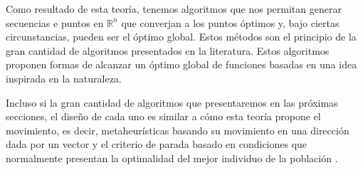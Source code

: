Como resultado de esta teoría, tenemos algoritmos que nos permitan generar secuencias e puntos en $\mathbb{R}^n$ que converjan a los puntos óptimos y, bajo ciertas circunstancias, pueden ser el óptimo global. 
Estos métodos son el principio de la gran cantidad de algoritmos presentados en la literatura. 
Estos algoritmos proponen formas de alcanzar un óptimo global  de funciones basadas en una idea inspirada en la naturaleza. 

Incluso si la gran cantidad de algoritmos que presentaremos en las próximas secciones, el diseño de cada uno es similar a cómo esta teoría propone el movimiento, es decir, metaheurísticas basando su movimiento en una dirección dada por un vector y el criterio de parada basado en condiciones que normalmente presentan la optimalidad del mejor individuo de la población .